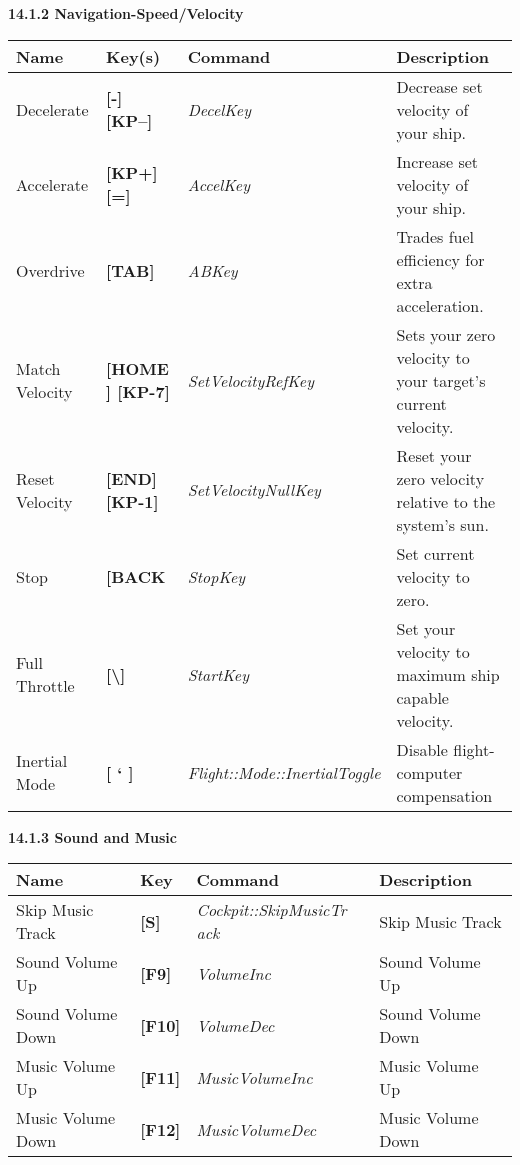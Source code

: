 \documentclass{article}
\begin{document}
\textbf{}

\textbf{}

\textbf{}

\textbf{}

\textbf{}

\textbf{14.1.2 Navigation-Speed/Velocity }

\begin{tabular}{|p{1.0in}|p{0.5in}|p{1.0in}|p{2.4in}|} \hline 
\textbf{ Name } & \textbf{ Key(s) } & \textbf{ Command } & \textbf{Description } \\ \hline 
Decelerate  & \textbf{[-] [KP--] } & \textit{DecelKey } & Decrease set velocity of your ship.  \\ \hline 
Accelerate  & \textbf{[KP+] [=] } & \textit{AccelKey } & Increase set velocity of your ship.  \\ \hline 
Overdrive & \textbf{[TAB] } & \textit{ABKey } & \newline Trades fuel efficiency for extra acceleration.  \\ \hline 
Match Velocity  & \textbf{[HOME ] [KP-7] } & \textit{SetVelocityRefKey } & Sets your zero velocity to your target's current velocity.  \\ \hline 
Reset Velocity  & \textbf{[END] [KP-1] } & \textit{SetVelocityNullKey } & Reset your zero velocity relative to the system's sun.  \\ \hline 
Stop  & \textbf{[BACK } & \textit{StopKey } & Set current velocity to zero.  \\ \hline 
Full Throttle  & \textbf{[\textbackslash ] } & \textit{StartKey } & Set your velocity to maximum ship capable velocity.  \\ \hline 
Inertial Mode  & \textbf{[ ` ] } & \textit{Flight::Mode::InertialToggle } & Disable flight-computer compensation  \\ \hline 
\end{tabular}

\textbf{}

\textbf{14.1.3 Sound and Music}

\begin{tabular}{|p{1.0in}|p{0.4in}|p{1.1in}|p{2.3in}|} \hline 
\textbf{ Name } & \textbf{Key } & \textbf{ Command } & \textbf{Description } \\ \hline 
Skip Music Track  & \textbf{[S] } & \textit{Cockpit::SkipMusicTr ack } & Skip Music Track  \\ \hline 
Sound Volume Up  & \textbf{[F9] } & \textit{VolumeInc } & Sound Volume Up  \\ \hline 
Sound Volume Down  & \textbf{[F10] } & \textit{VolumeDec } & Sound Volume Down  \\ \hline 
Music Volume Up  & \textbf{[F11] } & \textit{MusicVolumeInc } & Music Volume Up  \\ \hline 
Music Volume Down  & \textbf{[F12] } & \textit{MusicVolumeDec } & Music Volume Down  \\ \hline 
\end{tabular}
\end{document}
